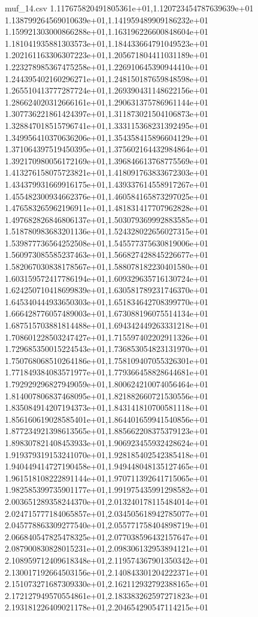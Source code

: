 \begin{filecontents*}{muf_14.csv}
1.117675820491805361e+01,1.120723454787639639e+01
1.138799264569010639e+01,1.141959489909186232e+01
1.159921303000866288e+01,1.163196226600848604e+01
1.181041935881303573e+01,1.184433664791049523e+01
1.202161163306307223e+01,1.205671804411031189e+01
1.223278985367475258e+01,1.226910645390944410e+01
1.244395402160296271e+01,1.248150187659848598e+01
1.265510413777287724e+01,1.269390431148622156e+01
1.286624020312666161e+01,1.290631375786961144e+01
1.307736221861424397e+01,1.311873021504106873e+01
1.328847018515796741e+01,1.333115368231392495e+01
1.349956410370636206e+01,1.354358415896604129e+01
1.371064397519450395e+01,1.375602164432984864e+01
1.392170980056172169e+01,1.396846613768775569e+01
1.413276158075723821e+01,1.418091763833672303e+01
1.434379931669916175e+01,1.439337614558917267e+01
1.455482300934662376e+01,1.460584165873297025e+01
1.476583265962196911e+01,1.481831417707962828e+01
1.497682826846806137e+01,1.503079369992883585e+01
1.518780983683201136e+01,1.524328022656027315e+01
1.539877736564252508e+01,1.545577375630819006e+01
1.560973085585237463e+01,1.566827428845226677e+01
1.582067030838178567e+01,1.588078182230401580e+01
1.603159572417786194e+01,1.609329635716130724e+01
1.624250710418699839e+01,1.630581789231746370e+01
1.645340444933650303e+01,1.651834642708399770e+01
1.666428776057489003e+01,1.673088196075514134e+01
1.687515703881814488e+01,1.694342449263331218e+01
1.708601228503247427e+01,1.715597402202911326e+01
1.729685350015224543e+01,1.736853054823131970e+01
1.750768068510264186e+01,1.758109407055326301e+01
1.771849384083571977e+01,1.779366458828644681e+01
1.792929296827949059e+01,1.800624210074056464e+01
1.814007806837468095e+01,1.821882660721530556e+01
1.835084914207194373e+01,1.843141810700581118e+01
1.856160619028585401e+01,1.864401659941540856e+01
1.877234921398613565e+01,1.885662208375379123e+01
1.898307821408453933e+01,1.906923455932428624e+01
1.919379319153241070e+01,1.928185402542385418e+01
1.940449414727190458e+01,1.949448048135127465e+01
1.961518108222891144e+01,1.970711392641715065e+01
1.982585399735901177e+01,1.991975435991298582e+01
2.003651289358244370e+01,2.013240178115484014e+01
2.024715777184065857e+01,2.034505618942785077e+01
2.045778863309277540e+01,2.055771758404898719e+01
2.066840547825478325e+01,2.077038596432157647e+01
2.087900830828015231e+01,2.098306132953894121e+01
2.108959712409618348e+01,2.119574367901350342e+01
2.130017192664503156e+01,2.140843301204222371e+01
2.151073271687309330e+01,2.162112932792388165e+01
2.172127949570554861e+01,2.183383262597271823e+01
2.193181226409021178e+01,2.204654290547114215e+01

\end{filecontents*}
